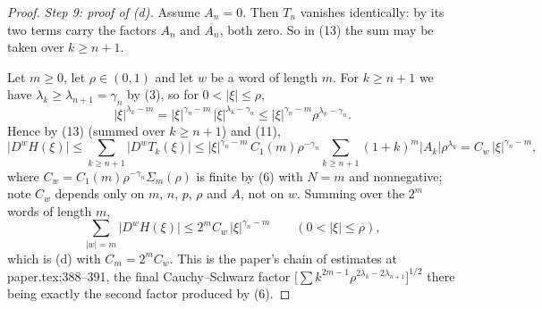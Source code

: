 \begin{proof}
\emph{Step 9: proof of (d).}  Assume $A_n=0$.  Then $T_n$ vanishes
identically: by  its two terms carry the factors $A_n$ and
$\overline{A_n}$, both zero.  So in (13) the sum may be taken over $k\ge n+1$.

Let $m\ge0$, let $\rho\in(0,1)$ and let $w$ be a word of length $m$.  For
$k\ge n+1$ we have $\lambda_k\ge\lambda_{n+1}=\gamma_n$ by (3), so for
$0<|\xi|\le\rho$,
\[
  |\xi|^{\lambda_k-m}=|\xi|^{\gamma_n-m}\,|\xi|^{\lambda_k-\gamma_n}
  \le|\xi|^{\gamma_n-m}\rho^{\lambda_k-\gamma_n}.
\]
Hence by (13) (summed over $k\ge n+1$) and (11),
\[
  \bigl|D^{w}H(\xi)\bigr|\le\sum_{k\ge n+1}\bigl|D^{w}T_k(\xi)\bigr|
  \le|\xi|^{\gamma_n-m}\,C_1(m)\rho^{-\gamma_n}
    \sum_{k\ge n+1}(1+k)^{m}|A_k|\rho^{\lambda_k}
  =C_w\,|\xi|^{\gamma_n-m},
\]
where $C_w=C_1(m)\rho^{-\gamma_n}\Sigma_m(\rho)$ is finite by (6) with $N=m$
and nonnegative; note $C_w$ depends only on $m$, $n$, $p$, $\rho$ and $A$, not
on $w$.  Summing over the $2^m$ words of length $m$,
\[
  \sum_{|w|=m}\bigl|D^{w}H(\xi)\bigr|\le 2^{m}C_w\,|\xi|^{\gamma_n-m}
  \qquad(0<|\xi|\le\rho),
\]
which is (d) with $C_m=2^{m}C_w$.  This is the paper's chain of estimates at
paper.tex:388--391, the final Cauchy--Schwarz factor
$\bigl[\sum k^{2m-1}\rho^{2\lambda_k-2\lambda_{n+1}}\bigr]^{1/2}$ there being
exactly the second factor produced by (6).
\end{proof}
